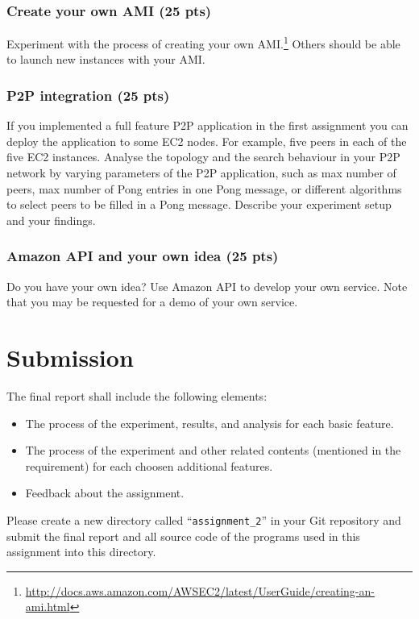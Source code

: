 \documentclass[12pt, a4paper]{article}
\begin{document}
\subsubsection{Create your own AMI (25 pts)}
Experiment with the process of creating your own AMI.\footnote{\url{http://docs.aws.amazon.com/AWSEC2/latest/UserGuide/creating-an-ami.html}}
Others should be able to launch new instances with your AMI.

\subsubsection{P2P integration (25 pts)}
If you implemented a full feature P2P application in the first assignment you can deploy the application to some EC2 nodes.
For example, five peers in each of the five EC2 instances.
Analyse the topology and the search behaviour in your P2P network by varying parameters of the P2P application, such as max number of peers, max number of Pong entries in one Pong message, or different algorithms to select peers to be filled in a Pong message.
Describe your experiment setup and your findings.

\subsubsection{Amazon API and your own idea (25 pts)}
Do you have your own idea?
Use Amazon API to develop your own service.
Note that you may be requested for a demo of your own service.

\section{Submission}
The final report shall include the following elements:

\begin{itemize}
\item The process of the experiment, results, and analysis for each basic feature.
\item The process of the experiment and other related contents (mentioned in the requirement) for each choosen additional features.
\item Feedback about the assignment.
\end{itemize}

Please create a new directory called ``\texttt{assignment\_2}'' in your Git repository and submit the final report and all source code of the programs used in this assignment into this directory.
\end{document}
